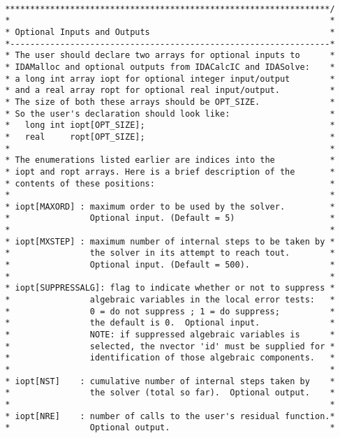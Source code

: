 \small
\begin{verbatim}

 *****************************************************************/
 *                                                                *
 * Optional Inputs and Outputs                                    *
 *----------------------------------------------------------------*
 * The user should declare two arrays for optional inputs to      *
 * IDAMalloc and optional outputs from IDACalcIC and IDASolve:    *
 * a long int array iopt for optional integer input/output        *
 * and a real array ropt for optional real input/output.          *
 * The size of both these arrays should be OPT_SIZE.              *
 * So the user's declaration should look like:                    *
 *   long int iopt[OPT_SIZE];                                     *
 *   real     ropt[OPT_SIZE];                                     *
 *                                                                *
 * The enumerations listed earlier are indices into the           * 
 * iopt and ropt arrays. Here is a brief description of the       *
 * contents of these positions:                                   *
 *                                                                *
 * iopt[MAXORD] : maximum order to be used by the solver.         *
 *                Optional input. (Default = 5)                   *
 *                                                                *
 * iopt[MXSTEP] : maximum number of internal steps to be taken by *
 *                the solver in its attempt to reach tout.        *
 *                Optional input. (Default = 500).                *
 *                                                                *
 * iopt[SUPPRESSALG]: flag to indicate whether or not to suppress *
 *                algebraic variables in the local error tests:   *
 *                0 = do not suppress ; 1 = do suppress;          *
 *                the default is 0.  Optional input.              *      
 *                NOTE: if suppressed algebraic variables is      * 
 *                selected, the nvector 'id' must be supplied for *
 *                identification of those algebraic components.   *
 *                                                                *
 * iopt[NST]    : cumulative number of internal steps taken by    *
 *                the solver (total so far).  Optional output.    *
 *                                                                *
 * iopt[NRE]    : number of calls to the user's residual function.*
 *                Optional output.                                *

\end{verbatim}

